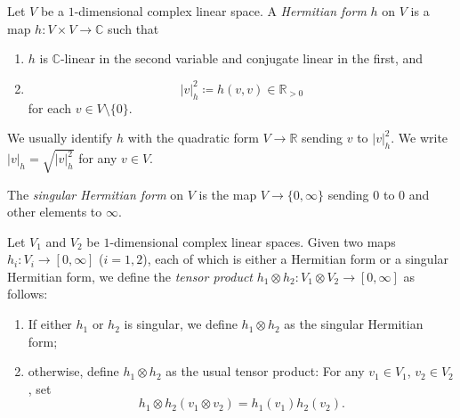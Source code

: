\begin{definition}\label{def:pshfunctions:L1743}
    Let $V$ be a $1$-dimensional complex linear space. A \emph{Hermitian form} $h$ on $V$ is a map $h\colon V\times V\rightarrow \mathbb{C}$ such that
    \begin{enumerate}
        \item\label{itm:chapter-pshfunctions:L1764:1} $h$ is $\mathbb{C}$-linear in the second variable and conjugate linear in the first, and
        \item\label{itm:chapter-pshfunctions:L1764:2}
        \[
        |v|_h^2\coloneqq h(v,v)\in \mathbb{R}_{>0}
        \]
        for each $v\in V\setminus\{0\}$.
    \end{enumerate}
    We usually identify $h$ with the quadratic form $V\rightarrow \mathbb{R}$ sending $v$ to $|v|_h^2$. We write $|v|_h=\sqrt{|v|_h^2}$ for any $v\in V$.

    The \emph{singular Hermitian form}  on $V$ is the map $V\rightarrow \{0,\infty\}$ sending $0$ to $0$ and other elements to $\infty$.
\end{definition}
\begin{definition}\label{def:1dimlinspacehermten}
    Let $V_1$ and $V_2$ be $1$-dimensional complex linear spaces. Given two maps $h_i\colon V_i\rightarrow [0,\infty]$ ($i=1,2$), each of which is either a Hermitian form or a singular Hermitian form, we define the \emph{tensor product} $h_1\otimes h_2\colon V_1\otimes V_2\rightarrow [0,\infty]$ as follows:
    \begin{enumerate}
        \item\label{itm:def:1dimlinspacehermten:1} If either $h_1$ or $h_2$ is singular, we define $h_1\otimes h_2$ as the singular Hermitian form;
        \item\label{itm:def:1dimlinspacehermten:2} otherwise, define $h_1\otimes h_2$ as the usual tensor product: For any $v_1\in V_1$, $v_2\in V_2$, set
        \[
        h_1\otimes h_2(v_1\otimes v_2)=h_1(v_1)h_2(v_2).
        \]
    \end{enumerate}
\end{definition}

